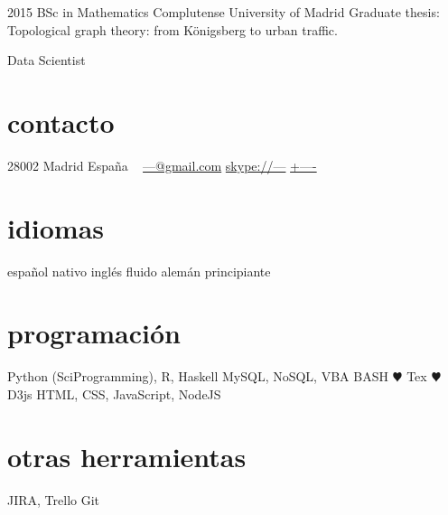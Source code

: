 \documentclass[]{friggeri-cv}
\begin{document}
\begin{entrylist}
  \entry
    {2015}
    {BSc in Mathematics}
    {Complutense University of Madrid}
    {Graduate thesis: Topological graph theory: from Königsberg to urban traffic.}
\end{entrylist}




\else

       {Data Scientist}


\begin{aside}
  \section{contacto}
    28002 Madrid
    España
    ~
    \href{mailto:---@gmail.com}{---@gmail.com}
    \href{skype:<--->[add]}{skype://---}
    \href{tel:----}{+----}
  \section{idiomas}
    español nativo
    inglés fluido
    alemán principiante
  \section{programación}
    Python (SciProgramming), R, Haskell
    MySQL, NoSQL, VBA
    BASH
    {\color{red} $\varheartsuit$} Tex
    {\color{red} $\varheartsuit$} D3js
    HTML, CSS, JavaScript, NodeJS
  \section{otras herramientas}
    JIRA, Trello
    Git
\end{aside}
\end{document}
